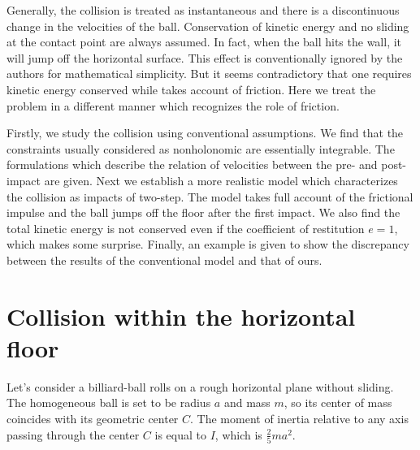 \documentclass[preprint,12pt]{elsarticle}
\begin{document}

Generally, the collision is treated as instantaneous and there is a discontinuous change in the velocities of the ball.
Conservation of kinetic energy and no sliding at the contact point are always assumed.
In fact, when the ball hits the wall, it will jump off the horizontal surface.
This effect is conventionally ignored by the authors for mathematical simplicity.
But it seems contradictory that one requires kinetic energy conserved while takes account of friction.
Here we treat the problem in a different manner which recognizes the role of friction.

Firstly, we study the collision using conventional assumptions. We find that the constraints usually considered as nonholonomic are essentially integrable. The formulations which describe the relation of velocities between the pre- and post-impact are given.
Next we establish a more realistic model which characterizes the collision as impacts of two-step. The model takes full account of the frictional impulse and the ball jumps off the floor after the first impact. We also find the total kinetic energy is not conserved even if the coefficient of restitution $e=1$, which makes some surprise. Finally, an example is given to show the discrepancy between the results of the conventional model and that of ours.

\section{Collision within the horizontal floor}\label{sec:collision}
Let's consider a billiard-ball rolls on a rough horizontal plane without sliding.
The homogeneous ball is set to be radius $a$ and mass $m$, so its center of mass coincides with its geometric center $C$.
The moment of inertia relative to any axis passing through the center $C$ is equal to $I$, which is $\frac{2}{5}m a^2$.
\end{document}
